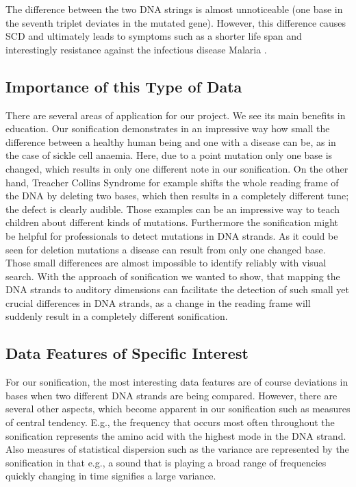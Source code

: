 \documentclass[10pt]{article}
\begin{document}
The difference between the two DNA strings is almost unnoticeable (one base in the 
seventh triplet deviates in the mutated gene). However, this difference causes SCD and 
ultimately leads to symptoms such as a shorter life span \cite{more_sickles} and interestingly 
resistance against the infectious disease Malaria \cite{sickle_cells}.
\subsection{Importance of this Type of Data}
There are several areas of application for our project. We see its main benefits in education. 
Our sonification demonstrates in an impressive way how small the difference between a 
healthy human being and one with a disease can be, as in the case of sickle cell anaemia. 
Here, due to a point mutation only one base is changed, which results in only one different 
note in our sonification. On the other hand, Treacher Collins Syndrome for example shifts the 
whole reading frame of the DNA by deleting two bases, which then results in a completely 
different tune; the defect is clearly audible. Those examples can be an impressive way to 
teach children about different kinds of mutations. Furthermore the sonification might be 
helpful for professionals to detect mutations in DNA strands. As it could be seen for deletion 
mutations a disease can result from only one changed base. Those small differences are 
almost impossible to identify reliably with visual search. With the approach of sonification 
we wanted to show, that mapping the DNA strands to auditory dimensions can facilitate the 
detection of such small yet crucial differences in DNA strands, as a change in the reading 
frame will suddenly result in a completely different sonification. 
\subsection{Data Features of Specific Interest}
For our sonification, the most interesting data features are of course deviations in 
bases when two different DNA strands are being compared. However, there are several other 
aspects, which become apparent in our sonification such as measures of central tendency. 
E.g., the frequency that occurs most often throughout the sonification represents the amino acid with the highest mode in the DNA strand. Also measures of statistical dispersion such as 
the variance are represented by the sonification in that e.g., a sound that is playing a broad 
range of frequencies quickly changing in time signifies a large variance.
\end{document}

